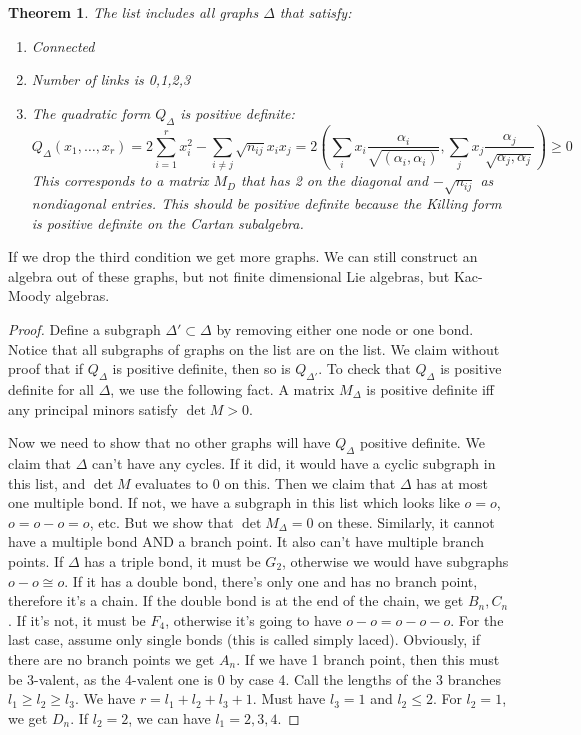 \documentclass[12 pt]{article}
\theoremstyle{plain}
\newtheorem*{thm*}{Theorem}
\theoremstyle{definition}
\theoremstyle{remark}
\begin{document}
\begin{thm*}
The list includes all graphs $\Delta$ that satisfy:
\begin{enumerate}
\item Connected
\item Number of links is 0,1,2,3
\item The quadratic form $Q_{\Delta}$ is positive definite:
\[        Q_{\Delta} (x_1, \dots, x_r) = 2 \sum_{i=1}^r x_i^2 - \sum_{i\neq j} \sqrt{n_{ij}} x_i x_j = 2 \left( \sum_i x_i \frac{\alpha_i}{\sqrt{(\alpha_i, \alpha_i)}} , \sum_j x_j \frac{\alpha_j}{\sqrt{\alpha_j, \alpha_j}}  \right)   \geq 0        \]
This corresponds to a matrix $M_D$ that has 2 on the diagonal and $- \sqrt{n_{ij}}$ as nondiagonal entries. This should be positive definite because the Killing form is positive definite on the Cartan subalgebra.
\end{enumerate}
\end{thm*}
If we drop the third condition we get more graphs. We can still construct an algebra out of these graphs, but not finite dimensional Lie algebras, but Kac-Moody algebras.

\begin{proof}
Define a subgraph $\Delta' \subset \Delta$ by removing either one node or one bond. Notice that all subgraphs of graphs on the list are on the list. We claim without proof that if $Q_{\Delta}$ is positive definite, then so is $Q_{\Delta'}$. To check that $Q_{\Delta}$ is positive definite for all $\Delta$, we use the following fact. A matrix $M_{\Delta}$ is positive definite iff any principal minors satisfy $\det M > 0$.

Now we need to show that no other graphs will have $Q_{\Delta}$ positive definite. We claim that $\Delta$ can't have any cycles. If it did, it would have a cyclic subgraph in this list, and $\det M$ evaluates to 0 on this. Then we claim that $\Delta$ has at most one multiple bond. If not, we have a subgraph in this list which looks like $o = o$, $o = o - o = o$, etc. But we show that $\det M_{\Delta} = 0$ on these. Similarly, it cannot have a multiple bond AND a branch point. It also can't have multiple branch points. If $\Delta$ has a triple bond, it must be $G_2$, otherwise we would have subgraphs $o - o \cong o$. If it has a double bond, there's only one and has no branch point, therefore it's a chain. If the double bond is at the end of the chain, we get $B_n, C_n$. If it's not, it must be $F_4$, otherwise it's going to have $o - o = o - o - o$. For the last case, assume only single bonds (this is called simply laced). Obviously, if there are no branch points we get $A_n$. If we have 1 branch point, then this must be 3-valent, as the 4-valent one is 0 by case 4. Call the lengths of the 3 branches $l_1 \geq l_2 \geq l_3$. We have $r = l_1 + l_2 + l_3 + 1$. Must have $l_3 = 1$ and $l_2 \leq 2$. For $l_2 = 1$, we get $D_n$. If $l_2 = 2$, we can have $l_1 = 2,3,4$.
\end{proof}
\end{document}
